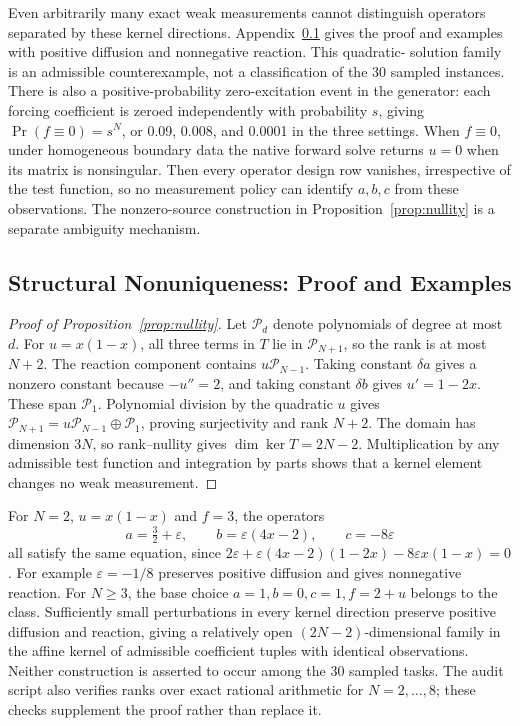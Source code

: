 \documentclass{article}
\newcommand{\Poly}{\mathcal{P}}
\begin{document}
Even arbitrarily many exact weak measurements cannot distinguish operators
separated by these kernel directions. Appendix~\ref{app:proof} gives the proof
and examples with positive diffusion and nonnegative reaction. This quadratic-
solution family is an admissible counterexample, not a classification of the
30 sampled instances. There is also a positive-probability
zero-excitation event in the generator: each forcing coefficient is zeroed
independently with probability \(s\), giving
\(\Pr(f\equiv0)=s^N\), or 0.09, 0.008, and 0.0001 in the three settings.
When \(f\equiv0\), under homogeneous boundary data the native forward solve returns \(u=0\) when
its matrix is nonsingular. Then every operator design row vanishes, irrespective
of the test function, so no measurement policy can identify \(a,b,c\) from
these observations. The nonzero-source construction in
Proposition~\ref{prop:nullity} is a separate ambiguity mechanism.

\subsection{Structural Nonuniqueness: Proof and Examples}
\label{app:proof}

\begin{proof}[Proof of Proposition~\ref{prop:nullity}]
Let \(\Poly_d\) denote polynomials of degree at most \(d\).
For \(u=x(1-x)\), all three terms in \(T\) lie in \(\Poly_{N+1}\),
so the rank is at most \(N+2\). The reaction component contains
\(u\Poly_{N-1}\). Taking constant \(\delta a\) gives a nonzero constant
because \(-u''=2\), and taking constant \(\delta b\) gives \(u'=1-2x\).
These span \(\Poly_1\). Polynomial division by the quadratic \(u\) gives
\(\Poly_{N+1}=u\Poly_{N-1}\oplus\Poly_1\), proving surjectivity and rank
\(N+2\). The domain has dimension \(3N\), so rank--nullity gives
\(\dim\ker T=2N-2\). Multiplication by any admissible test function and
integration by parts shows that a kernel element changes no weak measurement.
\end{proof}

For \(N=2\), \(u=x(1-x)\) and \(f=3\), the operators
\[
 a=\tfrac32+\varepsilon,\qquad b=\varepsilon(4x-2),\qquad c=-8\varepsilon
\]
all satisfy the same equation, since
\(2\varepsilon+\varepsilon(4x-2)(1-2x)-8\varepsilon x(1-x)=0\).
For example \(\varepsilon=-1/8\) preserves positive diffusion and gives
nonnegative reaction. For \(N\ge3\), the base choice
\(a=1,b=0,c=1,f=2+u\) belongs to the class. Sufficiently small perturbations
in every kernel direction preserve positive diffusion and reaction, giving a relatively open \((2N-2)\)-dimensional family in the affine kernel
of admissible coefficient tuples with identical observations.
Neither construction is asserted to occur among the 30 sampled tasks.
The audit script also verifies ranks over exact rational arithmetic for
\(N=2,\ldots,8\); these checks supplement the proof rather than replace it.
\end{document}
